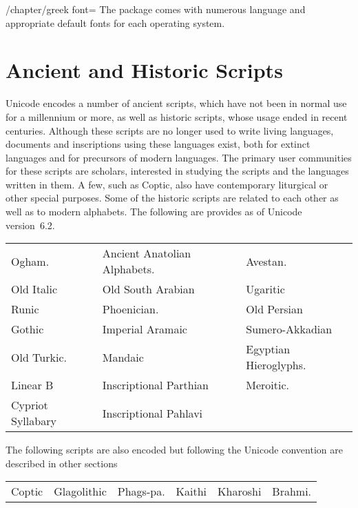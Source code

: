 \begin{key}{/chapter/greek font=}  
The package comes with numerous language and appropriate default fonts
for each operating system. 
\end{key}

\section{Ancient and Historic Scripts}

Unicode encodes a number of ancient scripts, which have not been in normal use for a millennium or more, as well as historic scripts, whose usage ended in recent centuries. Although these scripts are no longer used to write living languages, documents and inscriptions using these languages exist, both for extinct languages and for precursors of modern languages. The primary user communities for these scripts are scholars, interested in studying the scripts and the languages written in them. A few, such as Coptic, also have contemporary liturgical or other special purposes. Some of the historic scripts are related to each other as well as to modern alphabets. The following are provides as of Unicode version~6.2.

\begin{center}
\begin{tabular}{lll}
Ogham.     &Ancient Anatolian Alphabets. &Avestan.\\
Old Italic &Old South Arabian &Ugaritic\\
Runic &Phoenician. &Old Persian\\
Gothic &Imperial Aramaic &Sumero-Akkadian\\
Old Turkic. &Mandaic &Egyptian Hieroglyphs.\\
Linear B &Inscriptional Parthian &Meroitic.\\
Cypriot Syllabary &Inscriptional Pahlavi&\\
\end{tabular}
\end{center}

The following scripts are also encoded but following the Unicode
convention are described in other sections

\begin{center}
\begin{tabular}{llllll}
Coptic &Glagolithic &Phags-pa. &Kaithi &Kharoshi &Brahmi.\\
\end{tabular}
\end{center}


